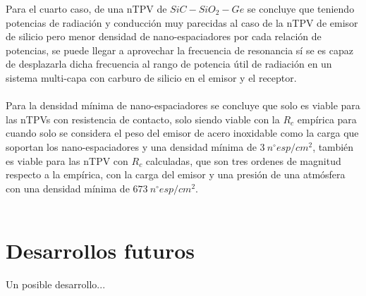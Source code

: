 Para el cuarto caso, de una nTPV de $SiC-SiO_2-Ge$ se concluye que teniendo potencias de radiación y conducción muy parecidas al caso de la nTPV de emisor de silicio pero menor densidad de nano-espaciadores por cada relación de potencias, se puede llegar a aprovechar la frecuencia de resonancia sí se es capaz de desplazarla dicha frecuencia al rango de potencia útil de radiación en un sistema multi-capa con carburo de silicio en el emisor y el receptor.\\\\
Para la densidad mínima de nano-espaciadores se concluye que solo es viable para las nTPVs con resistencia de contacto, solo siendo viable con la $R_c$ empírica para cuando solo se considera el peso del emisor de acero inoxidable como la carga que soportan los nano-espaciadores y una densidad mínima de $3 \ n^{\circ}esp/cm^2$, también es viable para las nTPV con $R_c$ calculadas, que son tres ordenes de magnitud respecto a la empírica, con la carga del emisor y una presión de una atmósfera con una densidad mínima de $673 \ n^{\circ}esp/cm^2$.\\\\


\section{Desarrollos futuros}

Un posible desarrollo...